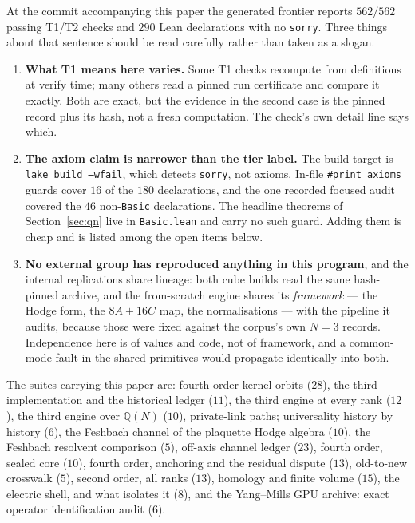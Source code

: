 \documentclass[11pt]{article}
\theoremstyle{definition}
\theoremstyle{remark}
\newcommand{\Q}{\mathbb{Q}}
\begin{document}
At the commit accompanying this paper the generated frontier reports
$562/562$ passing T1/T2 checks and $290$ Lean declarations with no
\texttt{sorry}. Three things about that sentence should be read carefully
rather than taken as a slogan.

\begin{enumerate}\itemsep3pt
\item \textbf{What T1 means here varies.} Some T1 checks recompute from
  definitions at verify time; many others read a pinned run certificate and
  compare it exactly. Both are exact, but the evidence in the second case is
  the pinned record plus its hash, not a fresh computation. The check's own
  detail line says which.
\item \textbf{The axiom claim is narrower than the tier label.} The build
  target is \texttt{lake build --wfail}, which detects \texttt{sorry}, not
  axioms. In-file \verb|#print axioms| guards cover $16$ of the $180$
  declarations, and the one recorded focused audit covered the $46$
  non-\texttt{Basic} declarations. The headline theorems of
  Section~\ref{sec:qn} live in \texttt{Basic.lean} and carry no such guard.
  Adding them is cheap and is listed among the open items below.
\item \textbf{No external group has reproduced anything in this program},
  and the internal replications share lineage: both cube builds read the same
  hash-pinned archive, and the from-scratch engine shares its \emph{framework}
  --- the Hodge form, the $8A+16C$ map, the normalisations --- with the
  pipeline it audits, because those were fixed against the corpus's own $N=3$
  records. Independence here is of values and code, not of framework, and a
  common-mode fault in the shared primitives would propagate identically into
  both.
\end{enumerate}

The suites
carrying this paper are: \textsf{fourth-order kernel orbits} ($28$),
\textsf{the third implementation and the historical ledger} ($11$),
\textsf{the third engine at every rank} ($12$), \textsf{the third engine over
$\Q(N)$} ($10$), \textsf{private-link paths; universality history by history}
($6$), \textsf{the Feshbach channel of the plaquette Hodge algebra} ($10$),
\textsf{the Feshbach resolvent comparison} ($5$), \textsf{off-axis channel
ledger} ($23$), \textsf{fourth order, sealed core} ($10$), \textsf{fourth
order, anchoring and the residual dispute} ($13$), \textsf{old-to-new
crosswalk} ($5$), \textsf{second order, all ranks} ($13$), \textsf{homology and
finite volume} ($15$), \textsf{the electric shell, and what isolates it} ($8$),
and \textsf{the Yang--Mills GPU archive: exact operator identification audit}
($6$).
\end{document}
